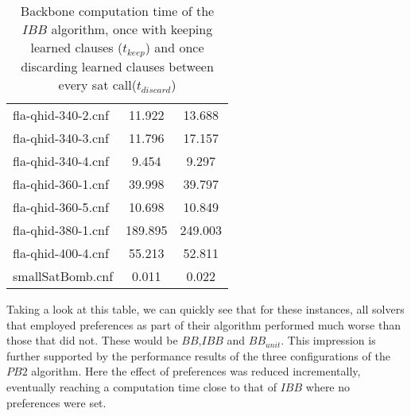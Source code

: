 \begin{wraptable}[30]{R}{8cm}
\begin{tabular}{l| c c }
fla-qhid-340-2.cnf & 11.922 & 13.688 \\
fla-qhid-340-3.cnf & 11.796 & 17.157 \\
fla-qhid-340-4.cnf & 9.454 & 9.297 \\
fla-qhid-360-1.cnf & 39.998 & 39.797 \\
fla-qhid-360-5.cnf & 10.698 & 10.849 \\
fla-qhid-380-1.cnf & 189.895 & 249.003 \\
fla-qhid-400-4.cnf & 55.213 & 52.811 \\
smallSatBomb.cnf & 0.011 & 0.022 \\
\end{tabular}
\caption{Backbone computation time of the $IBB$ algorithm, once with keeping learned clauses ($t_{keep}$) and once discarding learned clauses between every sat call($t_{discard}$)}
\label{tab:learnedIbb} %
\end{wraptable} 
Taking a look at this table, we can quickly see that for these instances, all solvers that employed preferences as part of their algorithm performed much worse than those that did not. These would be $BB$,$IBB$ and $BB_{unit}$. This impression is further supported by the performance results of the three configurations of the $PB2$ algorithm. Here the effect of preferences was reduced incrementally, eventually reaching a computation time close to that of $IBB$ where no preferences were set.



